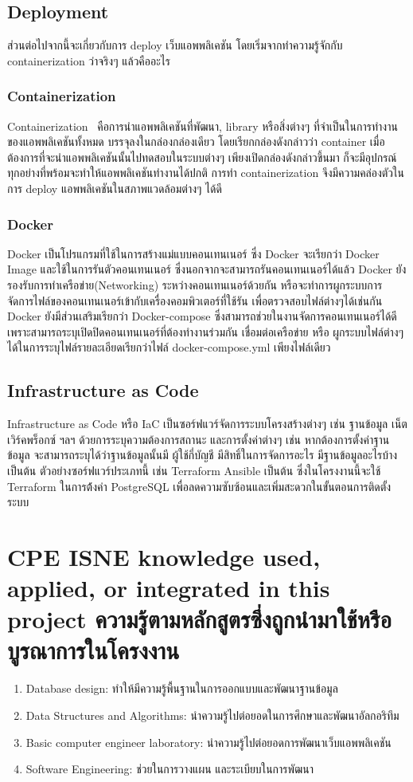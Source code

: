 \subsection{Deployment}
ส่วนต่อไปจากนี้จะเกี่ยวกับการ deploy เว็บแอพพลิเคชัน โดยเริ่มจากทำความรู้จักกับ 
containerization ว่าจริงๆ แล้วคืออะไร
\subsubsection{Containerization}
Containerization~\cite{ctnrh} คือการนำแอพพลิเคชันที่พัฒนา, library หรือสิ่งต่างๆ 
ที่จำเป็นในการทำงานของแอพพลิเคชันทั้งหมด บรรจุลงในกล่องกล่องเดียว โดยเรียกกล่องดังกล่าวว่า container 
เมื่อต้องการที่จะนำแอพพลิเคชันนั้นไปทดสอบในระบบต่างๆ เพียงเปิดกล่องดังกล่าวขึ้นมา
ก็จะมีอุปกรณ์ทุกอย่างที่พร้อมจะทำให้แอพพลิเคชันทำงานได้ปกติ การทำ containerization 
จึงมีความคล่องตัวในการ deploy แอพพลิเคชันในสภาพแวดล้อมต่างๆ ได้ดี 
\subsubsection{Docker}
Docker เป็นโปรแกรมที่ใช้ในการสร้างแม่แบบคอนเทนเนอร์ ซึ่ง Docker จะเรียกว่า Docker Image และใช้ในการรันตัวคอนเทนเนอร์
ซึ่งนอกจากจะสามารถรันคอนเทนเนอร์ได้แล้ว Docker ยังรองรับการทำเครือข่าย(Networking) ระหว่างคอนเทนเนอร์ด้วยกัน 
หรือจะทำการผูกระบบการจัดการไฟล์ของคอนเทนเนอร์เข้ากับเครื่องคอมพิวเตอร์ที่ใช้รัน เพื่อตรวจสอบไฟล์ต่างๆได้เช่นกัน
Docker ยังมีส่วนเสริมเรียกว่า Docker-compose ซึ่งสามารถช่วยในงานจัดการคอนเทนเนอร์ได้ดี เพราะสามารถระบุเปิดปิดคอนเทนเนอร์ที่ต้องทำงานร่วมกัน 
เชื่อมต่อเครือข่าย หรือ ผูกระบบไฟล์ต่างๆ ได้ในการระบุไฟล์รายละเอียดเรียกว่าไฟล์ docker-compose.yml เพียงไฟล์เดียว
\subsection{Infrastructure as Code}
Infrastructure as Code หรือ IaC เป็นซอร์ฟแวร์จัดการระบบโครงสร้างต่างๆ เช่น ฐานข้อมูล เน็ตเวิร์คพร็อกซ์ ฯลฯ 
ด้วยการระบุความต้องการสถานะ และการตั้งค่าต่างๆ เช่น หากต้องการตั้งค่าฐานข้อมูล จะสามารถระบุได้ว่าฐานข้อมูลนั้นมี ผู้ใช้กี่บัญชี 
มีสิทธิ์ในการจัดการอะไร มีฐานข้อมูลอะไรบ้าง เป็นต้น ตัวอย่างซอร์ฟแวร์ประเภทนี้ เช่น Terraform Ansible เป็นต้น
ซึ่งในโครงงานนี้จะใช้ Terraform ในการต้้งค่า PostgreSQL เพื่อลดความซับซ้อนและเพิ่มสะดวกในขั้นตอนการติดตั้งระบบ

\section{\ifenglish%
        \ifcpe CPE \else ISNE \fi knowledge used, applied, or integrated in this project
  \else%
        ความรู้ตามหลักสูตรซึ่งถูกนำมาใช้หรือบูรณาการในโครงงาน
  \fi
 }
\begin{enumerate}
      \item Database design: ทำให้มีความรู้พื้นฐานในการออกแบบและพัฒนาฐานข้อมูล
      \item Data Structures and Algorithms: นำความรู้ไปต่อยอดในการศึกษาและพัฒนาอัลกอริทึม
      \item Basic computer engineer laboratory: นำความรู้ไปต่อยอดการพัฒนาเว็บแอพพลิเคชัน
      \item Software Engineering: ช่วยในการวางแผน และระเบียบในการพัฒนา
\end{enumerate}


